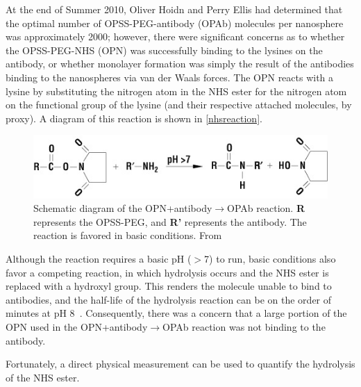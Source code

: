 
\def\mytitle{Chapter 2 -- Binding Antibodies to Nanospheres}

\def\bibliocommand{}
At the end of Summer 2010, Oliver Hoidn and Perry Ellis had determined that the optimal number of OPSS-PEG-antibody (OPAb) molecules per nanosphere was approximately 2000; however, there were significant concerns as to whether the OPSS-PEG-NHS (OPN) was successfully binding to the lysines on the antibody, or whether monolayer formation was simply the result of the antibodies binding to the nanospheres via van der Waals forces. The OPN reacts with a lysine by substituting the nitrogen atom in the NHS ester for the nitrogen atom on the functional group of the lysine (and their respective attached molecules, by proxy). A diagram of this reaction is shown in \autoref{nhsreaction}.

\begin{figure}[htbp]
\centering
\includegraphics[keepaspectratio,width=\textwidth,height=0.75\textheight]{NHSreaction.jpg}
\caption{Schematic diagram of the OPN+antibody$\to$OPAb reaction. \textbf{R} represents the OPSS-PEG, and \textbf{R'} represents the antibody. The reaction is favored in basic conditions. From ~\citep{nhsreaction}}
\label{nhsreaction}
\end{figure}



Although the reaction requires a basic pH ($>$7) to run, basic conditions also favor a competing reaction, in which hydrolysis occurs and the NHS ester is replaced with a hydroxyl group. This renders the molecule unable to bind to antibodies, and the half-life of the hydrolysis reaction can be on the order of minutes at pH 8~\citep{nhshalflife}. Consequently, there was a concern that a large portion of the OPN used in the OPN+antibody$\to$OPAb reaction was not binding to the antibody.

Fortunately, a direct physical measurement can be used to quantify the hydrolysis of the NHS ester. 




